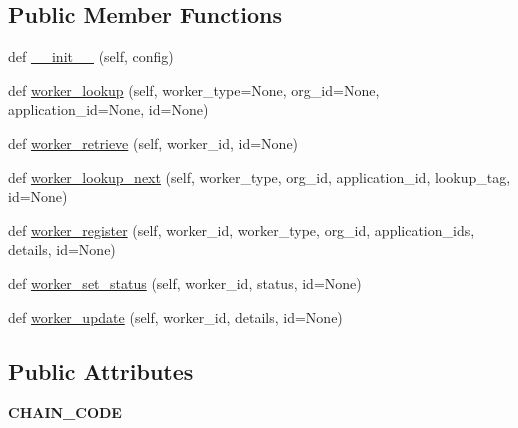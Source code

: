 \subsection*{Public Member Functions}
\begin{DoxyCompactItemize}
\item 
def \hyperlink{classavalon__sdk_1_1connector_1_1blockchains_1_1fabric_1_1fabric__worker__registry_1_1FabricWorkerRegistryImpl_a200848113403df0a9a3cfa825dd2d6d7}{\+\_\+\+\_\+init\+\_\+\+\_\+} (self, config)
\item 
def \hyperlink{classavalon__sdk_1_1connector_1_1blockchains_1_1fabric_1_1fabric__worker__registry_1_1FabricWorkerRegistryImpl_a2af93095d492836d42c2fea72c558dd0}{worker\+\_\+lookup} (self, worker\+\_\+type=None, org\+\_\+id=None, application\+\_\+id=None, id=None)
\item 
def \hyperlink{classavalon__sdk_1_1connector_1_1blockchains_1_1fabric_1_1fabric__worker__registry_1_1FabricWorkerRegistryImpl_a98651da17a2c3766a2cdfe562b3714eb}{worker\+\_\+retrieve} (self, worker\+\_\+id, id=None)
\item 
def \hyperlink{classavalon__sdk_1_1connector_1_1blockchains_1_1fabric_1_1fabric__worker__registry_1_1FabricWorkerRegistryImpl_a82429da0b926f4cc6d2ad2fb8a99e149}{worker\+\_\+lookup\+\_\+next} (self, worker\+\_\+type, org\+\_\+id, application\+\_\+id, lookup\+\_\+tag, id=None)
\item 
def \hyperlink{classavalon__sdk_1_1connector_1_1blockchains_1_1fabric_1_1fabric__worker__registry_1_1FabricWorkerRegistryImpl_af78f67f5545b5bdcf1ae7a2012b7416a}{worker\+\_\+register} (self, worker\+\_\+id, worker\+\_\+type, org\+\_\+id, application\+\_\+ids, details, id=None)
\item 
def \hyperlink{classavalon__sdk_1_1connector_1_1blockchains_1_1fabric_1_1fabric__worker__registry_1_1FabricWorkerRegistryImpl_aabbb04881481e5d2ffd76f9bfc16088f}{worker\+\_\+set\+\_\+status} (self, worker\+\_\+id, status, id=None)
\item 
def \hyperlink{classavalon__sdk_1_1connector_1_1blockchains_1_1fabric_1_1fabric__worker__registry_1_1FabricWorkerRegistryImpl_a070296571a578943d33d0aa5a570a18b}{worker\+\_\+update} (self, worker\+\_\+id, details, id=None)
\end{DoxyCompactItemize}
\subsection*{Public Attributes}
\begin{DoxyCompactItemize}
\item 
\mbox{\label{classavalon__sdk_1_1connector_1_1blockchains_1_1fabric_1_1fabric__worker__registry_1_1FabricWorkerRegistryImpl_a45431ffd3a196d2533eaae986c2bb709}} 
{\bfseries C\+H\+A\+I\+N\+\_\+\+C\+O\+DE}
\end{DoxyCompactItemize}


